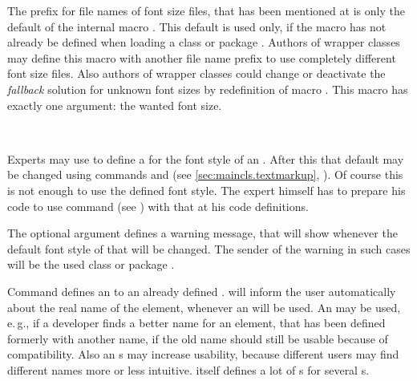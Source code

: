 \begin{Declaration}
\end{Declaration}
%
The prefix  for file names of font size files, that has been
mentioned at
 is only the default of the
internal macro . This
default is used only, if the macro has not already be defined when loading a
\KOMAScript{} class or package . Authors of wrapper classes
may define this macro with another file name prefix to use completely
different font size files. Also authors of wrapper classes
could change or deactivate the \emph{fallback} solution for unknown font sizes
by redefinition of macro
%
. This macro has exactly one argument: the wanted
font size.%
%
%

\begin{Declaration}
                     \\
\end{Declaration}
%
%
Experts may use  to define a  for the font
style of an . After this that default may be changed using
commands  and  (see
\autoref{sec:maincls.textmarkup},
). Of course this is not enough to
use the defined font style. The expert himself has to prepare his code to use
command
 (see
) with that  at his
code definitions.

The optional argument  defines a warning message,
that \KOMAScript{} will show whenever the default font style of that
 will be changed. The sender of the warning in such cases will
be the used \KOMAScript{} class or package .

Command  defines an  to an already
defined . \KOMAScript{} will inform the user automatically
about the real name of the element, whenever an  will be
used. An  may be used, e.\,g., if a
developer finds a better name for an element, that has been defined formerly
with another name, if the old name should still be usable because of
compatibility. Also an s may increase usability, because
different users may find different names more or less intuitive. \KOMAScript{}
itself defines a lot of s for several s.
%
%
%

